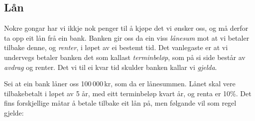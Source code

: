 \subsection{Lån}
Nokre gongar har vi ikkje nok penger til å kjøpe det vi ønsker oss, og må derfor ta opp eit lån frå ein bank. Banken gir oss da ein viss \textit{lånesum} mot at vi betaler tilbake denne, og \textit{renter}, i løpet av ei bestemt tid. Det vanlegaste er at vi undervegs betaler banken det som kallast \textit{terminbeløp}, som på si side består av \textit{avdrag} og renter. Det vi til ei kvar tid skulder banken kallar vi \textit{gjelda}. \vsk

Sei at ein bank låner  oss 100\,000\,kr, som da er lånesummen. Lånet skal vere tilbakebetalt i løpet av 5 år, med eitt terminbeløp kvart år, og renta er 10\%. Det fins forskjellige måtar å betale tilbake eit lån på, men følgande vil som regel gjelde:

